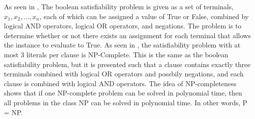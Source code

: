 \documentclass[manuscript]{acmart}
\begin{document}
        As seen in \cite{10.1145/800157.805047},
        The boolean satisfiability problem is given as a set of terminals, $x_1, x_2, ..., x_n$,
        each of which can be assigned a value of True or False,
        combined by logical AND operators, logical OR operators, and negations.
        The problem is to determine whether or not there exists an assignment
        for each terminal that allows the instance to evaluate to True.
        As seen in \cite{Karp1972}, the satisfiability problem
        with at most 3 literals per clause is NP-Complete. This is the same 
        as the boolean satisfiability problem, but it is presented such that
        a clause contains exactly three terminals combined with logical OR operators
        and possbily negations, and each clause is combined with logical AND operators.
        The idea of NP-completeness shows that if one NP-complete problem can be solved
        in polynomial time, then all problems in the class NP can be solved in polynomial time.
        In other words, P = NP. 
\end{document}
